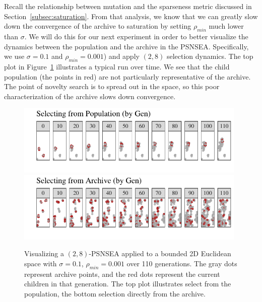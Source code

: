 \documentclass[twoside]{article}
\begin{document}
Recall the relationship between mutation and the sparseness metric discussed in Section~\ref{subsec:saturation}.  From that analysis, we know that we can greatly slow down the convergence of the archive to saturation by setting $\rho_{min}$ much lower than $\sigma$.  We will do this for our next experiment in order to better visualize the dynamics between the population and the archive in the PSNSEA.  Specifically, we use $\sigma=0.1$ and $\rho_{min}=0.001$) and apply $(2,8)$ selection dynamics.  The top plot in Figure~\ref{fig:viz-select} illustrates a typical run over time.  We see that the child population (the points in red) are not particularly representative of the archive.  The point of novelty search is to spread out in the space, so this poor characterization of the archive slows down convergence.
%
\begin{figure}[h]
  \includegraphics[width=0.98\textwidth]{Figures/viz-archive-and-pop-s01-r0001-mu16lam32-popsel.pdf}\\[-1em]
  \includegraphics[width=0.98\textwidth]{Figures/viz-archive-and-pop-s01-r0001-mu16lam32-archsell.pdf}
  \caption{\label{fig:viz-select} Visualizing a $(2,8)$-PSNSEA applied to a bounded 2D Euclidean space with $\sigma=0.1$, $\rho_{min}=0.001$ over 110 generations.  The gray dots represent archive points, and the red dots represent the current children in that generation.  The top plot illustrates select from the population, the bottom selection directly from the archive.}
\end{figure}
\end{document}
